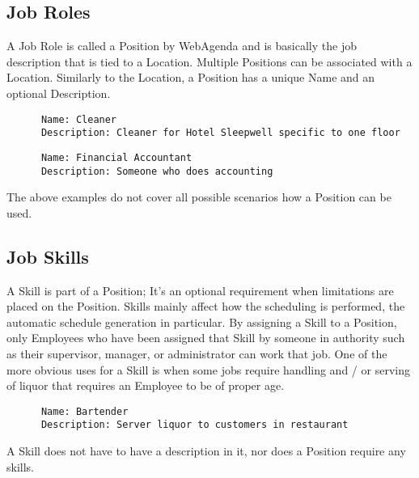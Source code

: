 \documentclass[a4paper,10pt]{report}
\begin{document}
\subsection{Job Roles}

\par \noindent \hspace*{1cm} A Job Role is called a Position by WebAgenda and is basically the job description that is tied to a Location. Multiple Positions can be associated with a Location. Similarly to the Location, a Position has a unique Name and an optional Description.

\begin{verbatim}
      Name: Cleaner
      Description: Cleaner for Hotel Sleepwell specific to one floor
\end{verbatim}

\begin{verbatim}
      Name: Financial Accountant
      Description: Someone who does accounting
\end{verbatim}

\par \noindent \hspace*{1cm} The above examples do not cover all possible scenarios how a Position can be used.

\subsection{Job Skills}

\par \noindent \hspace*{1cm} A Skill is part of a Position; It's an optional requirement when limitations are placed on the Position. Skills mainly affect how the scheduling is performed, the automatic schedule generation in particular. By assigning a Skill to a Position, only Employees who have been assigned that Skill by someone in authority such as their supervisor, manager, or administrator can work that job. One of the more obvious uses for a Skill is when some jobs require handling and / or serving of liquor that requires an Employee to be of proper age. 

\begin{verbatim}
      Name: Bartender
      Description: Server liquor to customers in restaurant
\end{verbatim}

\par \noindent \hspace*{1cm} A Skill does not have to have a description in it, nor does a Position require any skills.
\end{document}
